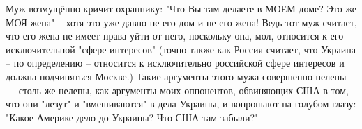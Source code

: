 Муж возмущённо кричит охраннику: "Что Вы там делаете в МОЕМ доме? Это же МОЯ жена" -- хотя это уже давно не его дом и не его жена! 
Ведь тот муж считает, что его жена не имеет права уйти от него, поскольку она, мол, относится к его исключительной "сфере интересов" (точно также как Россия считает, что Украина -- по определению -- относится к исключительно российской сфере интересов и должна подчиняться Москве.)
Такие аргументы этого мужа совершенно нелепы --- столь же нелепы, как аргументы моих оппонентов, обвиняющих США в том, что они "лезут" и "вмешиваются" в дела Украины, и вопрошают на голубом глазу: "Какое Америке дело до Украины? Что США там забыли?"
